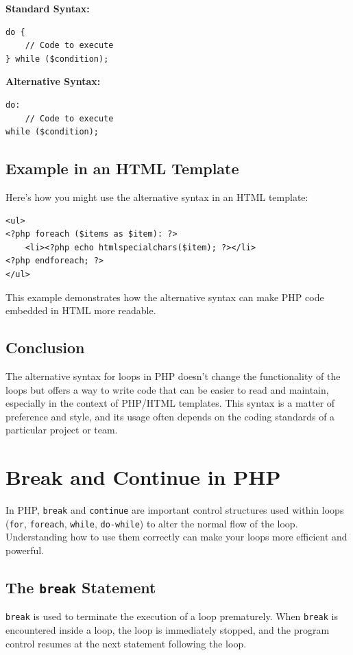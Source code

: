 \documentclass[11pt]{article}
\begin{document}
\textbf{Standard Syntax:}

\begin{verbatim}
do {
    // Code to execute
} while ($condition);
\end{verbatim}

\textbf{Alternative Syntax:}

\begin{verbatim}
do:
    // Code to execute
while ($condition);
\end{verbatim}

\subsection{Example in an HTML Template}
\label{sec:org56b8d1b}
Here's how you might use the alternative syntax in an HTML template:

\begin{verbatim}
<ul>
<?php foreach ($items as $item): ?>
    <li><?php echo htmlspecialchars($item); ?></li>
<?php endforeach; ?>
</ul>
\end{verbatim}

This example demonstrates how the alternative syntax can make PHP code
embedded in HTML more readable.

\subsection{Conclusion}
\label{sec:org112aae7}
The alternative syntax for loops in PHP doesn't change the functionality
of the loops but offers a way to write code that can be easier to read
and maintain, especially in the context of PHP/HTML templates. This
syntax is a matter of preference and style, and its usage often depends
on the coding standards of a particular project or team.

\section{Break and Continue in PHP}
\label{sec:org1b1f0c3}
In PHP, \texttt{break} and \texttt{continue} are important control structures used
within loops (\texttt{for}, \texttt{foreach}, \texttt{while}, \texttt{do-while}) to alter the normal
flow of the loop. Understanding how to use them correctly can make your
loops more efficient and powerful.

\subsection{The \texttt{break} Statement}
\label{sec:orgf1f1089}
\texttt{break} is used to terminate the execution of a loop prematurely. When
\texttt{break} is encountered inside a loop, the loop is immediately stopped,
and the program control resumes at the next statement following the
loop.
\end{document}
